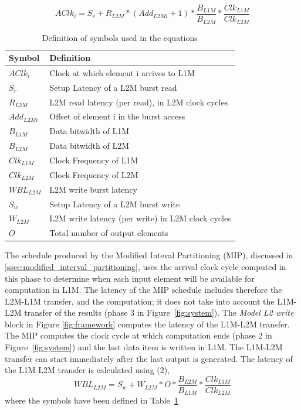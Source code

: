 \begin{equation}
AClk_i = S_r + R_{L2M} * (Add_{L2Mi}+1) * \frac{B_{L1M}}{B_{L2M}} * \frac{Clk_{L1M}}{Clk_{L2M}}
\end{equation}

\begin{table}[]
\centering
\footnotesize
\begin{tabular}{|l|l|}
\hline
\textbf{Symbol} & \textbf{Definition}                                           \\ \hline
$AClk_i$           & Clock at which element i arrives to L1M                \\
$S_r$             & Setup Latency of a L2M burst read                          \\
$R_{L2M}$       & L2M read latency (per read), in L2M clock cycles   \\
$Add_{L2Mi}$     & Offset of element i in the burst access \\
$B_{L1M}$        & Data bitwidth of L1M                                       \\
$B_{L2M}$        & Data bitwidth of L2M                                       \\
$Clk_{L1M}$      & Clock Frequency of L1M                                     \\
$Clk_{L2M}$      & Clock Frequency of L2M                                     \\
$WBL_{L2M}$      & L2M write burst latency                                    \\
$S_w$             & Setup Latency of a L2M burst write                         \\
$W_{L2M}$       & L2M write latency (per write) in L2M clock cycles  \\
$O$                 & Total number of output elements                            \\ \hline
\end{tabular}
\caption{\small Definition of symbols used in the equations}
\label{table:equation}
\end{table}
The schedule produced by the Modified Inteval Partitioning (MIP), discussed in \ref{ssec:modified_interval_partitioning}, uses the arrival clock cycle computed in this phase to determine when each input element will be available for computation in L1M. The latency of the MIP schedule includes therefore the L2M-L1M transfer, and the computation; it does not take into account the L1M-L2M transfer of the results (phase 3 in Figure~\ref{fig:system}).
The \textit{Model L2 write} block in Figure \ref{fig:framework} computes the latency of the L1M-L2M transfer. The MIP computes the clock cycle at which computation ends (phase 2 in Figure~\ref{fig:system}) and the last data item is written in L1M. The L1M-L2M transfer can start immediately after the last output is generated.
The latency of the L1M-L2M transfer is calculated using (2),
\begin{equation}
    WBL_{L2M} = S_w + W_{L2M} * O * \frac{B_{L2M}}{B_{L1M}} * \frac{Clk_{L1M}}{Clk_{L2M}}
\end{equation}
where the symbols have been defined in Table~\ref{table:equation}


